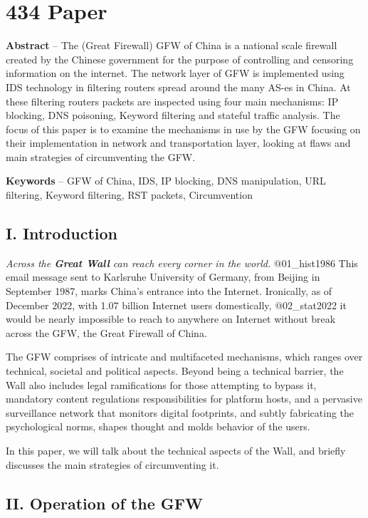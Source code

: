 \hypertarget{paper}{%
\section{434 Paper}\label{paper}}

\textbf{Abstract} -- The (Great Firewall) GFW of China is a national
scale firewall created by the Chinese government for the purpose of
controlling and censoring information on the internet. The network layer
of GFW is implemented using IDS technology in filtering routers spread
around the many AS-es in China. At these filtering routers packets are
inspected using four main mechanisms: IP blocking, DNS poisoning,
Keyword filtering and stateful traffic analysis. The focus of this paper
is to examine the mechanisms in use by the GFW focusing on their
implementation in network and transportation layer, looking at flaws and
main strategies of circumventing the GFW.

\textbf{Keywords} -- GFW of China, IDS, IP blocking, DNS manipulation,
URL filtering, Keyword filtering, RST packets, Circumvention

\hypertarget{i.-introduction}{%
\subsection{I. Introduction}\label{i.-introduction}}

\emph{Across the \textbf{Great Wall} can reach every corner in the
world.} @01\_hist1986 This email message sent to Karlsruhe University of
Germany, from Beijing in September 1987, marks China's entrance into the
Internet. Ironically, as of December 2022, with 1.07 billion Internet
users domestically, @02\_stat2022 it would be nearly impossible to reach
to anywhere on Internet without break across the GFW, the Great Firewall
of China.

The GFW comprises of intricate and multifaceted mechanisms, which ranges
over technical, societal and political aspects. Beyond being a technical
barrier, the Wall also includes legal ramifications for those attempting
to bypass it, mandatory content regulations responsibilities for
platform hosts, and a pervasive surveillance network that monitors
digital footprints, and subtly fabricating the psychological norms,
shapes thought and molds behavior of the users.

In this paper, we will talk about the technical aspects of the Wall, and
briefly discusses the main strategies of circumventing it.

\hypertarget{ii.-operation-of-the-gfw}{%
\subsection{II. Operation of the GFW}\label{ii.-operation-of-the-gfw}}

